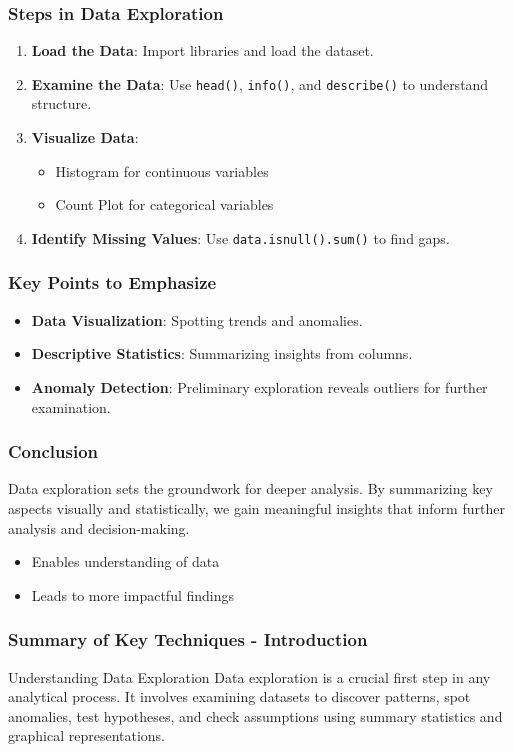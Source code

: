 \documentclass[aspectratio=169]{beamer}
\begin{document}
\begin{frame}
  \frametitle{Steps in Data Exploration}
  \begin{enumerate}
    \item \textbf{Load the Data}: Import libraries and load the dataset.
    \item \textbf{Examine the Data}: Use \texttt{head()}, \texttt{info()}, and \texttt{describe()} to understand structure.
    \item \textbf{Visualize Data}:
      \begin{itemize}
        \item Histogram for continuous variables
        \item Count Plot for categorical variables
      \end{itemize}
    \item \textbf{Identify Missing Values}: Use \texttt{data.isnull().sum()} to find gaps.
  \end{enumerate}
\end{frame}

\begin{frame}
  \frametitle{Key Points to Emphasize}
  \begin{itemize}
    \item \textbf{Data Visualization}: Spotting trends and anomalies.
    \item \textbf{Descriptive Statistics}: Summarizing insights from columns.
    \item \textbf{Anomaly Detection}: Preliminary exploration reveals outliers for further examination.
  \end{itemize}
\end{frame}

\begin{frame}
  \frametitle{Conclusion}
  Data exploration sets the groundwork for deeper analysis. By summarizing key aspects visually and statistically, we gain meaningful insights that inform further analysis and decision-making. 
  \begin{itemize}
    \item Enables understanding of data
    \item Leads to more impactful findings
  \end{itemize}
\end{frame}

\begin{frame}[fragile]
    \frametitle{Summary of Key Techniques - Introduction}
    \begin{block}{Understanding Data Exploration}
        Data exploration is a crucial first step in any analytical process. It involves examining datasets to discover patterns, spot anomalies, test hypotheses, and check assumptions using summary statistics and graphical representations.
    \end{block}
\end{frame}
\end{document}
